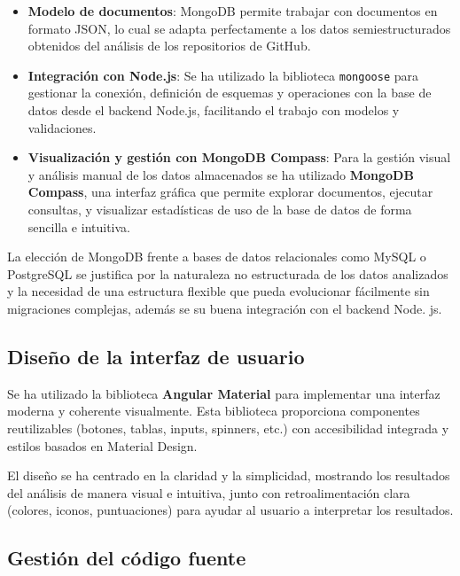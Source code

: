 \begin{itemize}
  \item \textbf{Modelo de documentos}: MongoDB permite trabajar con documentos en formato JSON, lo cual se adapta perfectamente a los datos semiestructurados obtenidos del análisis de los repositorios de GitHub.
  
  \item \textbf{Integración con Node.js}: Se ha utilizado la biblioteca \texttt{mongoose} para gestionar la conexión, definición de esquemas y operaciones con la base de datos desde el backend Node.js, facilitando el trabajo con modelos y validaciones.
  
  \item \textbf{Visualización y gestión con MongoDB Compass}: Para la gestión visual y análisis manual de los datos almacenados se ha utilizado \textbf{MongoDB Compass}, una interfaz gráfica que permite explorar documentos, ejecutar consultas, y visualizar estadísticas de uso de la base de datos de forma sencilla e intuitiva.
  
\end{itemize}

La elección de MongoDB frente a bases de datos relacionales como MySQL o PostgreSQL se justifica por la naturaleza no estructurada de los datos analizados y la necesidad de una estructura flexible que pueda evolucionar fácilmente sin migraciones complejas, además se su buena integración con el backend Node. js.


\subsection{Diseño de la interfaz de usuario}

Se ha utilizado la biblioteca \textbf{Angular Material} para implementar una interfaz moderna y coherente visualmente. Esta biblioteca proporciona componentes reutilizables (botones, tablas, inputs, spinners, etc.) con accesibilidad integrada y estilos basados en Material Design.

El diseño se ha centrado en la claridad y la simplicidad, mostrando los resultados del análisis de manera visual e intuitiva, junto con retroalimentación clara (colores, iconos, puntuaciones) para ayudar al usuario a interpretar los resultados.

\subsection{Gestión del código fuente}

